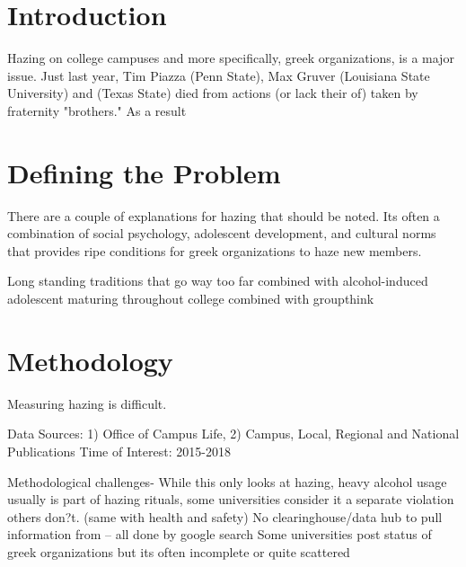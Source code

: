 \documentclass[12pt]{amsart}
\title{}
\author{}
\date{} %
\begin{document}
\maketitle

\section{Introduction}

Hazing on college campuses and more specifically, greek organizations, is a major issue. Just last year, Tim Piazza (Penn State), Max Gruver (Louisiana State University) and (Texas State) died from actions (or lack their of) taken by fraternity "brothers." As a result

\section{Defining the Problem}

There are a couple of explanations for hazing that should be noted. Its often a combination of social psychology, adolescent development, and cultural norms that provides ripe conditions for greek organizations to haze new members.

Long standing traditions that go way too far combined with alcohol-induced adolescent maturing throughout college combined with groupthink

\section{Methodology}

Measuring hazing is difficult. 

Data Sources: 1) Office of Campus Life, 2) Campus, Local, Regional and National Publications
Time of Interest: 2015-2018

Methodological challenges- While this only looks at hazing, heavy alcohol usage usually is part of hazing rituals, some universities consider it a separate violation others don?t. (same with health and safety) 
No clearinghouse/data hub to pull information from -- all done by google search
Some universities post status of greek organizations but its often incomplete or quite scattered
\end{document}
